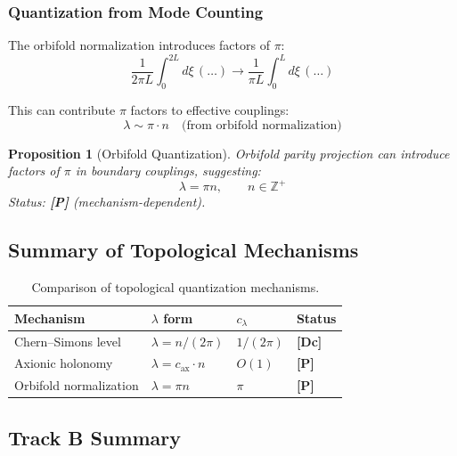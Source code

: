 \documentclass[11pt,a4paper]{article}
\newcommand{\tagDc}{\textbf{[Dc]}}
\newcommand{\tagP}{\textbf{[P]}}
\theoremstyle{definition}
\theoremstyle{plain}
\newtheorem{proposition}{Proposition}[section]
\theoremstyle{remark}
\begin{document}
\subsubsection{Quantization from Mode Counting}

The orbifold normalization introduces factors of $\pi$:
\begin{equation}
\frac{1}{2\pi L} \int_0^{2L} d\xi \, (\ldots) \to \frac{1}{\pi L} \int_0^L d\xi \, (\ldots)
\label{eq:orbifold-norm}
\end{equation}

This can contribute $\pi$ factors to effective couplings:
\begin{equation}
\lambda \sim \pi \cdot n \quad \text{(from orbifold normalization)}
\label{eq:lambda-orbifold}
\end{equation}

\begin{proposition}[Orbifold Quantization]
\label{prop:orbifold-quant}
Orbifold parity projection can introduce factors of $\pi$ in boundary couplings,
suggesting:
\begin{equation}
\lambda = \pi n, \qquad n \in \mathbb{Z}^+
\label{eq:lambda-orbifold-result}
\end{equation}
Status: \tagP{} (mechanism-dependent).
\end{proposition}

\subsection{Summary of Topological Mechanisms}

\begin{table}[htbp]
\centering
\caption{Comparison of topological quantization mechanisms.}
\label{tab:mechanisms}
\begin{tabular}{@{}llll@{}}
\toprule
Mechanism & $\lambda$ form & $c_\lambda$ & Status \\
\midrule
Chern--Simons level & $\lambda = n/(2\pi)$ & $1/(2\pi)$ & \tagDc{} \\
Axionic holonomy & $\lambda = c_{\mathrm{ax}} \cdot n$ & $O(1)$ & \tagP{} \\
Orbifold normalization & $\lambda = \pi n$ & $\pi$ & \tagP{} \\
\bottomrule
\end{tabular}
\end{table}

\subsection{Track B Summary}
\end{document}
